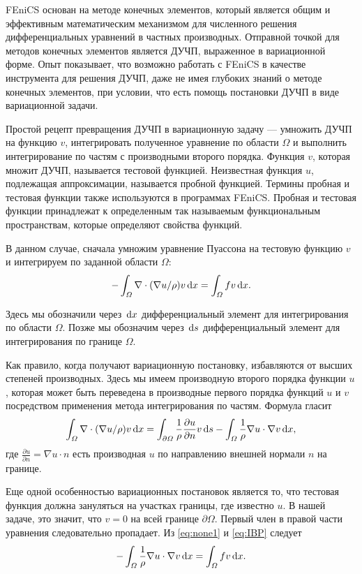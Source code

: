 FEniCS основан на методе конечных элементов, который является общим и эффективным математическим механизмом для численного решения дифференциальных уравнений в частных производных. Отправной точкой для методов конечных элементов является ДУЧП, выраженное в вариационной форме. Опыт показывает, что возможно работать с FEniCS в качестве инструмента для решения ДУЧП, даже не имея глубоких знаний о методе конечных элементов, при условии, что есть помощь постановки ДУЧП в виде вариационной задачи.

Простой рецепт превращения ДУЧП в вариационную задачу --- умножить ДУЧП на функцию $v$, интегрировать полученное уравнение по области $\Omega$ и выполнить интегрирование по частям с производными второго порядка. Функция $v$, которая множит ДУЧП, называется тестовой функцией. Неизвестная функция $u$, подлежащая аппроксимации, называется пробной функцией. Термины пробная и тестовая функции также используются в программах FEniCS. Пробная и тестовая функции принадлежат к определенным так называемым функциональным пространствам, которые определяют свойства функций.

В данном случае, сначала умножим уравнение Пуассона на тестовую функцию $v$ и интегрируем по заданной области $\Omega$: 
\begin{equation} \label{eq:none1}
  - \int_\varOmega \nabla \cdot (\nabla u / \rho)v \, \mathrm{d}x 
  = \int_\varOmega f v \, \mathrm{d}x.
\end{equation}

Здесь мы обозначили через $\, \mathrm{d}x$ дифференциальный элемент для интегрирования по области $\Omega$. Позже мы обозначим через $\, \mathrm{d}s$ дифференциальный элемент для интегрирования по границе $\Omega$.

Как правило, когда получают вариационную постановку, избавляются от высших степеней производных. Здесь мы имеем производную второго порядка функции $u$, которая может быть переведена в производные первого порядка функций $u$ и $v$ посредством применения метода интегрирования по частям. Формула гласит
\begin{equation} \label{eq:IBP}
  \int_\varOmega \nabla \cdot (\nabla u / \rho)v \, \mathrm{d}x
= \int_{\partial\varOmega} \frac 1 \rho {\partial u\over\partial n}v \, \mathrm{d}s
- \int_\varOmega \frac 1 \rho \nabla u\cdot\nabla v \, \mathrm{d}x,
\end{equation}
где $\frac{\partial u}{\partial n} = \nabla u \cdot n$ есть производная $u$ по направлению внешней нормали $n$ на границе.

Еще одной особенностью вариационных постановок является то, что тестовая функция должна зануляться на участках границы, где известно $u$. В нашей задаче, это значит, что $v = 0$ на всей границе $\partial\Omega$. Первый член в правой части уравнения следовательно пропадает. Из \eqref{eq:none1} и \eqref{eq:IBP} следует
\begin{equation} \label{eq:weakform}
- \int_\varOmega \frac 1 \rho \nabla u\cdot\nabla v \, \mathrm{d}x = \int_\varOmega f v \, \mathrm{d}x.
\end{equation}

